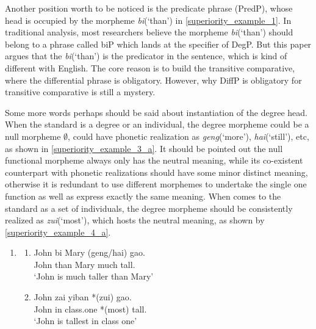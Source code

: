 \documentclass{ctexart}
\begin{document}
Another position worth to be noticed is the predicate phrase (PredP), whose head is occupied by the morpheme \textit{bi}(`than') in \ref{superiority_example_1}. In traditional analysis, most researchers believe the morpheme \textit{bi}(`than') should belong to a phrase called biP which lands at the specifier of DegP. But this paper argues that the \textit{bi}(`than') is the predicator in the sentence, which is kind of different with English. The core reason is to build the transitive comparative, where the differential phrase is obligatory. However, why DiffP is obligatory for transitive comparative is still a mystery. 

Some more words perhaps should be said about instantiation of the degree head. When the standard is a degree or an individual, the degree morpheme could be a null morpheme $\emptyset$, could have phonetic realization as \textit{geng}(`more'), \textit{hai}(`still'), etc, as shown in \ref{superiority_example_3_a}. It should be pointed out the null functional morpheme  always only has the neutral meaning, while its co-existent counterpart with phonetic realizations should have some minor distinct meaning, otherwise it is redundant to use  different morphemes to undertake the single one function as well as express exactly the same meaning. When comes to the standard as a set of individuals, the degree morpheme should be consistently realized as \textit{zui}(`most'), which hosts the neutral meaning, as shown by \ref{superiority_example_4_a}.

\begin{enumerate}
    \item \label{superiority_example_3}
    \begin{enumerate}
        \item \label{superiority_example_3_a}
        John bi \enspace Mary (geng/hai) gao. \\
        John than Mary \enspace much \enspace \enspace tall. \\
        `John is much taller than Mary'

        \item \label{superiority_example_4_a}
        John zai \enspace yiban *(zui) \enspace gao. \\
        John in class.one *(most) tall. \\
        `John is tallest in class one'


    \end{enumerate}
\end{enumerate}
\end{document}
